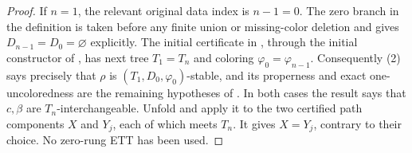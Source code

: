 \begin{proof}
If $n=1$, the relevant original data index is $n-1=0$.  The zero branch
in the definition  is taken before any
finite union or missing-color deletion and gives
$D_{n-1}=D_0=\varnothing$ explicitly.  The initial certificate in
, through the initial constructor of
, has next tree $T_1=T_n$ and coloring
$\varphi_0=\varphi_{n-1}$.  Consequently (2) says precisely that $\rho$
is $(T_1,D_0,\varphi_0)$-stable, and its properness and exact
one-uncoloredness are the remaining hypotheses of
.  In both cases the result says that
$c,\beta$ are $T_n$-interchangeable.  Unfold
 and apply it to the two certified path
components $X$ and $Y_j$, each of which meets $T_n$.  It gives
$X=Y_j$, contrary to their choice.  No zero-rung ETT has been used.

\end{proof}
